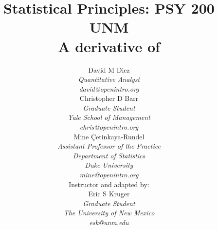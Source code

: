 \title{\huge Statistical Principles: PSY 200 UNM\vspace{1.5mm} \\ \Large A derivative of }
\author{David M Diez \\
\small\emph{Quantitative Analyst} \\
\vspace{6mm}%
\small\emph{david@openintro.org} \\
Christopher D Barr \\
\small\emph{Graduate Student} \\
\small\emph{Yale School of Management} \\
\vspace{6mm}%
\small\emph{chris@openintro.org} \\
Mine \c{C}etinkaya-Rundel \\
\small\emph{Assistant Professor of the Practice} \\
\small\emph{Department of Statistics} \\
\small\emph{Duke University} \\
\vspace{6mm}%
\small\emph{mine@openintro.org} \\
Instructor and adapted by: \\
Eric S Kruger \\
\small\emph{Graduate Student} \\
\small\emph{The University of New Mexico} \\
\vspace{6mm}%
\small\emph{esk@unm.edu}}
